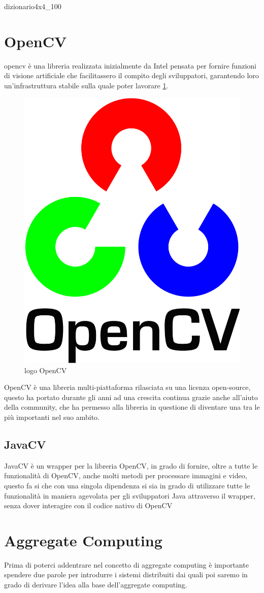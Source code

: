 \documentclass[12pt,a4paper,openright,twoside]{book}
\begin{document}
\begin{center}
	\gls{dizionario4x4_100}
\end{center}

\section{OpenCV} \label{sec:opencv}
\acrfull{opencv} è una libreria realizzata inizialmente da Intel pensata per fornire funzioni di visione artificiale che facilitassero il compito degli sviluppatori, garantendo loro un'infrastruttura stabile sulla quale poter lavorare \ref{fig:opencvLogo}.
\begin{figure}[h!]
	\centering
	\includegraphics[width=0.3\linewidth]{figures/opencvLogo.png}
	\caption{logo OpenCV}
	\label{fig:opencvLogo}
\end{figure}


OpenCV è una libreria multi-piattaforma rilasciata su una licenza open-source, questo ha portato durante gli anni ad una crescita continua grazie anche all'aiuto della community, che ha permesso alla libreria in questione di diventare una tra le più importanti nel suo ambito. \cite{baggio2015opencv} \cite{OpenCVMainPage}

\subsection{JavaCV} \label{subsec:javacv}
JavaCV è un wrapper per la libreria OpenCV, in grado di fornire, oltre a tutte le funzionalità di OpenCV, anche molti metodi per processare immagini e video, questo fa si che con una singola dipendenza si sia in grado di utilizzare tutte le funzionalità in maniera agevolata per gli sviluppatori Java attraverso il wrapper, senza dover interagire con il codice nativo di OpenCV \cite{javaCVRepo}

\section{Aggregate Computing}
Prima di poterci addentrare nel concetto di aggregate computing è importante spendere due parole per introdurre i sistemi distribuiti dai quali poi saremo in grado di derivare l'idea alla base dell'aggregate computing.
\end{document}
